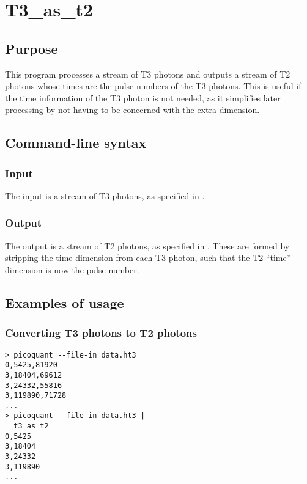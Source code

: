 \section{T3\_as\_t2}
\subsection{Purpose}
This program processes a stream of T3 photons and outputs a stream of T2 photons whose times are the pulse numbers of the T3 photons. This is useful if the time information of the T3 photon is not needed, as it simplifies later processing by not having to be concerned with the extra dimension.

\subsection{Command-line syntax}


\subsubsection{Input}
The input is a stream of T3 photons, as specified in .

\subsubsection{Output}
The output is a stream of T2 photons, as specified in . These are formed by stripping the time dimension from each T3 photon, such that the T2 ``time'' dimension is now the pulse number.

\subsection{Examples of usage}
\subsubsection{Converting T3 photons to T2 photons}
\begin{verbatim}
> picoquant --file-in data.ht3 
0,5425,81920
3,18404,69612
3,24332,55816
3,119890,71728
...
> picoquant --file-in data.ht3 |
  t3_as_t2
0,5425
3,18404
3,24332
3,119890
...
\end{verbatim}